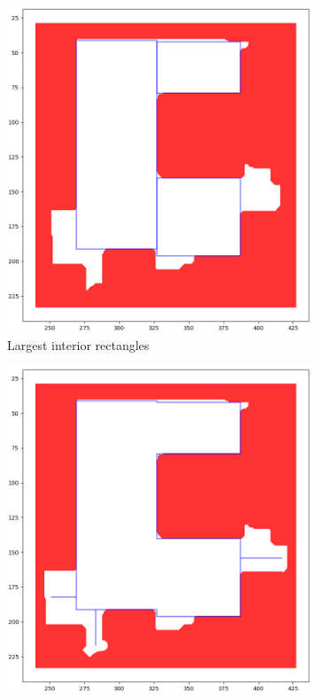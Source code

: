 \begin{figure}[h]
\begin{subfigure}{.25\textwidth}
      \includegraphics[width=\textwidth]{figures/50_implementation/ryu_room2_rectangles.png}
      \caption{Largest interior rectangles}
    \end{subfigure}%
    \begin{subfigure}{.25\textwidth}
      \centering
      \includegraphics[width=\textwidth]{figures/50_implementation/ryu_room2_roadmap.png}

\end{subfigure}
\end{figure}
